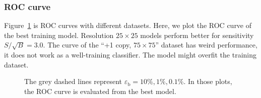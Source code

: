 \documentclass[12pt]{article}
\begin{document}
        \subsubsection{ROC curve}%
        \label{subs:roc_curve}
            Figure~\ref{fig:roc_curve_SB_3_5_7} is ROC curves with different datasets. Here, we plot the ROC curve of the best training model. Resolution $25\times 25$ models perform better for sensitivity $S / \sqrt{B} = 3.0$. The curve of the ``+1 copy, $75\times 75$'' dataset has weird performance, it does not work as a well-training classifier. The model might overfit the training dataset.
            \begin{figure}[htpb]
                \centering
                \caption{The grey dashed lines represent $\varepsilon_{\text{b}}=10 \%, 1 \%, 0.1\%$. In those plots, the ROC curve is evaluated from the best model.}
                \label{fig:roc_curve_SB_3_5_7}
            \end{figure}
\end{document}
